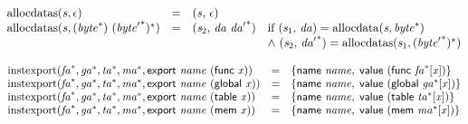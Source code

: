 $$
\begin{array}{@{}lcl@{}l@{}}
{\mathrm{allocdatas}}({\mathit{s}}, \epsilon) &=& ({\mathit{s}},\, \epsilon) &  \\
{\mathrm{allocdatas}}({\mathit{s}}, ({{\mathit{byte}}^\ast})~{({{\mathit{byte}'}^\ast})^\ast}) &=& ({\mathit{s}}_{{2}},\, {\mathit{da}}~{{\mathit{da}'}^\ast}) &\quad
  \mbox{if}~({\mathit{s}}_{{1}},\, {\mathit{da}}) = {\mathrm{allocdata}}({\mathit{s}}, {{\mathit{byte}}^\ast}) \\
 &&&\quad {\land}~({\mathit{s}}_{{2}},\, {{\mathit{da}'}^\ast}) = {\mathrm{allocdatas}}({\mathit{s}}_{{1}}, {({{\mathit{byte}'}^\ast})^\ast}) \\
\end{array}
$$

\vspace{1ex}

$$
\begin{array}{@{}lcl@{}l@{}}
{\mathrm{instexport}}({{\mathit{fa}}^\ast}, {{\mathit{ga}}^\ast}, {{\mathit{ta}}^\ast}, {{\mathit{ma}}^\ast}, \mathsf{export}~{\mathit{name}}~(\mathsf{func}~{\mathit{x}})) &=& \{ \begin{array}[t]{@{}l@{}}
\mathsf{name}~{\mathit{name}},\; \mathsf{value}~(\mathsf{func}~{{\mathit{fa}}^\ast}[{\mathit{x}}]) \}\end{array} &  \\
{\mathrm{instexport}}({{\mathit{fa}}^\ast}, {{\mathit{ga}}^\ast}, {{\mathit{ta}}^\ast}, {{\mathit{ma}}^\ast}, \mathsf{export}~{\mathit{name}}~(\mathsf{global}~{\mathit{x}})) &=& \{ \begin{array}[t]{@{}l@{}}
\mathsf{name}~{\mathit{name}},\; \mathsf{value}~(\mathsf{global}~{{\mathit{ga}}^\ast}[{\mathit{x}}]) \}\end{array} &  \\
{\mathrm{instexport}}({{\mathit{fa}}^\ast}, {{\mathit{ga}}^\ast}, {{\mathit{ta}}^\ast}, {{\mathit{ma}}^\ast}, \mathsf{export}~{\mathit{name}}~(\mathsf{table}~{\mathit{x}})) &=& \{ \begin{array}[t]{@{}l@{}}
\mathsf{name}~{\mathit{name}},\; \mathsf{value}~(\mathsf{table}~{{\mathit{ta}}^\ast}[{\mathit{x}}]) \}\end{array} &  \\
{\mathrm{instexport}}({{\mathit{fa}}^\ast}, {{\mathit{ga}}^\ast}, {{\mathit{ta}}^\ast}, {{\mathit{ma}}^\ast}, \mathsf{export}~{\mathit{name}}~(\mathsf{mem}~{\mathit{x}})) &=& \{ \begin{array}[t]{@{}l@{}}
\mathsf{name}~{\mathit{name}},\; \mathsf{value}~(\mathsf{mem}~{{\mathit{ma}}^\ast}[{\mathit{x}}]) \}\end{array} &  \\
\end{array}
$$


